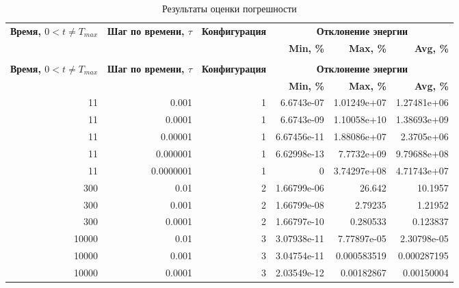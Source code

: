 \begin{longtable}{|r|r|r|r|r|r|}
	\caption{Результаты оценки погрешности} \label{tbl:experiment} 
	\\
	\hline
	\multirow{2}{0.14\textwidth}{\textbf{Время, $0<t\neq T_{max}$}} & \multirow{2}{0.13\textwidth}{\textbf{Шаг по времени, $\tau$}} &  \multirow{2}{0.17\textwidth}{\textbf{Конфигурация}} & \multicolumn{3}{|c|}{\textbf{Отклонение энергии}} \\
	\cline{4-6} & & &
	 \multicolumn{1}{|p{0.14\textwidth}|}{\textbf{Min, \%}} & \multicolumn{1}{|p{0.14\textwidth}|}{\textbf{Max, \%}} & \multicolumn{1}{|p{0.14\textwidth}|}{\textbf{Avg, \%}} \\
	\hline
	\endfirsthead
	\caption{Результаты оценки погрешности}
	\\
	\hline
	\multirow{2}{0.14\textwidth}{\textbf{Время, $0<t\neq T_{max}$}} & \multirow{2}{0.13\textwidth}{\textbf{Шаг по времени, $\tau$}} &  \multirow{2}{0.17\textwidth}{\textbf{Конфигурация}} & \multicolumn{3}{|c|}{\textbf{Отклонение энергии}} \\
	\cline{4-6} & & &
	\multicolumn{1}{|p{0.14\textwidth}|}{\textbf{Min, \%}} & \multicolumn{1}{|p{0.14\textwidth}|}{\textbf{Max, \%}} & \multicolumn{1}{|p{0.14\textwidth}|}{\textbf{Avg, \%}} \\
	\hline
	\endhead
\hline
11 & 0.001 & 1 & 6.6743e-07 & 1.01249e+07 & 1.27481e+06 \\ \hline
11 & 0.0001 & 1 & 6.6743e-09 & 1.10058e+10 & 1.38693e+09 \\ \hline
11 & 0.00001 & 1 & 6.67456e-11 & 1.88086e+07 & 2.3705e+06 \\ \hline
11 & 0.000001 & 1 & 6.62998e-13 & 7.7732e+09 & 9.79688e+08 \\ \hline
11 & 0.0000001 & 1 & 0 & 3.74297e+08 & 4.71743e+07 \\ \hline
300 & 0.01 & 2 & 1.66799e-06 & 26.642 & 10.1957 \\ \hline
300 & 0.001 & 2 & 1.66799e-08 & 2.79235 & 1.21952 \\ \hline
300 & 0.0001 & 2 & 1.66797e-10 & 0.280533 & 0.123837 \\ \hline
10000 & 0.01 & 3 & 3.07938e-11 & 7.77897e-05 & 2.30798e-05 \\ \hline
10000 & 0.001 & 3 & 3.04754e-11 & 0.000583519 & 0.000287195 \\ \hline
10000 & 0.0001 & 3 & 2.03549e-12 & 0.00182867 & 0.00150004 \\ \hline

\end{longtable}

